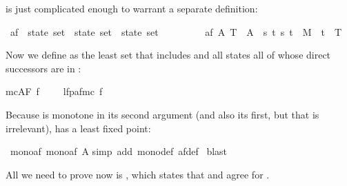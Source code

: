 \begin{isabellebody}
\begin{isamarkuptext}
is just complicated enough to warrant a separate definition:%
\end{isamarkuptext}%
\isamarkuptrue%
\isamarkupfalse%
\ af\ {\isacharcolon}{\isacharcolon}\ {\isachardoublequoteopen}state\ set\ {\isasymRightarrow}\ state\ set\ {\isasymRightarrow}\ state\ set{\isachardoublequoteclose}\isanewline
\ \ \ \ \ \ \ \ \ {\isachardoublequoteopen}af\ A\ T\ {\isasymequiv}\ A\ {\isasymunion}\ {\isacharbraceleft}s{\isachardot}\ {\isasymforall}t{\isachardot}\ {\isacharparenleft}s{\isacharcomma}\ t{\isacharparenright}\ {\isasymin}\ M\ {\isasymlongrightarrow}\ t\ {\isasymin}\ T{\isacharbraceright}{\isachardoublequoteclose}%
\begin{isamarkuptext}%
\noindent
Now we define  as the least set  that includes
 and all states all of whose direct successors are in :%
\end{isamarkuptext}%
\isamarkuptrue%
{\isachardoublequoteopen}mc{\isacharparenleft}AF\ f{\isacharparenright}\ \ \ \ {\isacharequal}\ lfp{\isacharparenleft}af{\isacharparenleft}mc\ f{\isacharparenright}{\isacharparenright}{\isachardoublequoteclose}%
\begin{isamarkuptext}%
\noindent
Because  is monotone in its second argument (and also its first, but
that is irrelevant),  has a least fixed point:%
\end{isamarkuptext}%
\isamarkuptrue%
\isamarkupfalse%
\ mono{\isacharunderscore}af{\isacharcolon}\ {\isachardoublequoteopen}mono{\isacharparenleft}af\ A{\isacharparenright}{\isachardoublequoteclose}\isanewline
%
\isadelimproof
%
\endisadelimproof
%
\isatagproof
{}\isamarkupfalse%
{\isacharparenleft}simp\ add{\isacharcolon}\ mono{\isacharunderscore}def\ af{\isacharunderscore}def{\isacharparenright}\isanewline
{}\isamarkupfalse%
\ blast\isanewline
{}\isamarkupfalse%
%
\endisatagproof
{\isafoldproof}%
%
\isadelimproof
%
\endisadelimproof
%
\isadelimproof
%
\endisadelimproof
%
\isatagproof
%
\endisatagproof
{\isafoldproof}%
%
\isadelimproof
%
\endisadelimproof
%
\isadelimproof
%
\endisadelimproof
%
\isatagproof
%
\endisatagproof
{\isafoldproof}%
%
\isadelimproof
%
\endisadelimproof
%
\begin{isamarkuptext}%
All we need to prove now is  , which states
that  and \isa{{\isasymTurnstile}} agree for \@.

\end{isamarkuptext}
\end{isabellebody}

